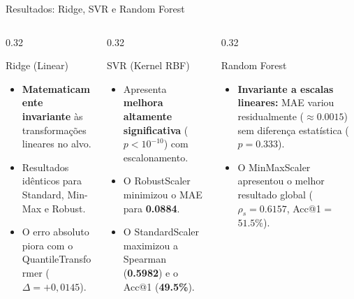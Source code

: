 \documentclass[aspectratio=169, 10pt]{beamer}
\begin{document}
\begin{frame}{Resultados: Ridge, SVR e Random Forest}
  \begin{columns}[T]
    \begin{column}{0.32\textwidth}
      \begin{block}{Ridge (Linear)}
        \footnotesize
        \begin{itemize}
          \item \textbf{Matematicamente invariante} às transformações lineares no alvo.
          \item Resultados idênticos para Standard, Min-Max e Robust.
          \item O erro absoluto piora com o QuantileTransformer ($\Delta = +0,0145$).
        \end{itemize}
      \end{block}
    \end{column}
    
    \begin{column}{0.32\textwidth}
      \begin{block}{SVR (Kernel RBF)}
        \footnotesize
        \begin{itemize}
          \item Apresenta \textbf{melhora altamente significativa} ($p < 10^{-10}$) com escalonamento.
          \item O RobustScaler minimizou o MAE para \textbf{0.0884}.
          \item O StandardScaler maximizou a Spearman (\textbf{0.5982}) e o Acc@1 (\textbf{49.5\%}).
        \end{itemize}
      \end{block}
    \end{column}
    
    \begin{column}{0.32\textwidth}
      \begin{block}{Random Forest}
        \footnotesize
        \begin{itemize}
          \item \textbf{Invariante a escalas lineares:} MAE variou residualmente ($\approx 0.0015$) sem diferença estatística ($p = 0.333$).
          \item O MinMaxScaler apresentou o melhor resultado global ($\rho_s = \mathbf{0.6157}$, Acc@1 = $\mathbf{51.5\%}$).
        \end{itemize}
      \end{block}
    \end{column}
  \end{columns}
\end{frame}
\end{document}

